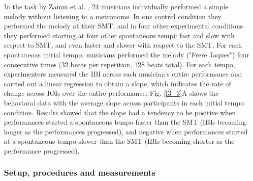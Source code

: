 \documentclass{report}
\begin{document}
In the task by Zamm et al. \cite{zamm2018musicians}, 24 musicians individually performed a simple melody without listening to a metronome. In one control condition they performed the melody at their SMT, and in four other experimental conditions they performed starting at four other spontaneous tempi: fast and slow with respect to SMT, and even faster and slower with respect to the SMT. For each spontaneous initial tempo, musicians performed the melody ("Frere Jaques") four consecutive times (32 beats per repetition, 128 beats total). For each tempo, experimenters measured the IBI across each musician's entire performance and carried out a linear regression to obtain a slope, which indicates the rate of change across IOIs over the entire performance. Fig.{} \ref{f3_3}A shows the behavioral data with the average slope across participants in each initial tempo condition. Results showed that the slope had a tendency to be positive when performances started a spontaneous tempo faster than the SMT (IBIs becoming longer as the performances progressed), and negative when performances started at a spontaneous tempo slower than the SMT (IBIs becoming shorter as the performance progressed).

\subsubsection{Setup, procedures and measurements}
\end{document}
